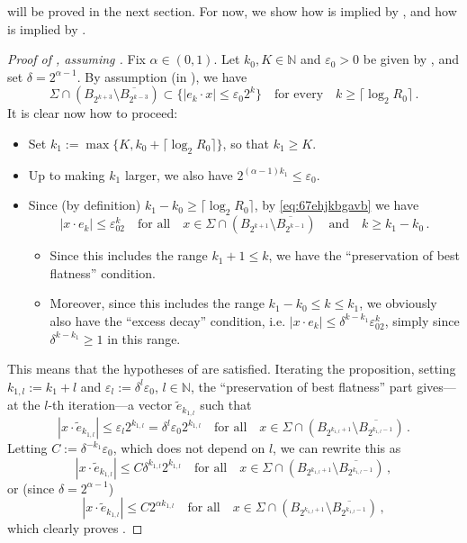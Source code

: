 \documentclass{article}
\newcommand{\N}{\mathbb{N}}
\newcommand{\ep}{\varepsilon}
\theoremstyle{definition}
\begin{document}
 will be proved in the next section. For now, we show how  is implied by , and how  is implied by .
\begin{proof}[Proof of , assuming ]
    Fix $\alpha\in (0,1)$. Let $k_0,K\in\N$ and $\ep_0>0$ be given by , and set $\delta=2^{\alpha-1}$. By assumption (in ), we have
    \begin{equation}\label{eq:67ehjkbgavb}
        \Sigma \cap (B_{2^{k+3}}\setminus \overline{B_{2^{k-3}}})\subset \{|e_k\cdot x|\leq \ep_0 2^k\}\quad\mbox{for every}\quad k\geq \lceil \log_2{R_0}\rceil\,.
    \end{equation}
    It is clear now how to proceed:
    \begin{itemize}
        \item Set $k_1:=\max\{K,k_0+\lceil \log_2{R_0}\rceil\}$, so that $k_1\geq K$.
        \item Up to making $k_1$ larger, we also have $2^{(\alpha-1)k_1}\leq \ep_0$.
        \item Since (by definition) $k_1-k_0\geq \lceil \log_2{R_0}\rceil$, by \eqref{eq:67ehjkbgavb} we have
        $$|x\cdot e_k|\leq \ep_02^k\quad \mbox{for all}\quad x\in\Sigma\cap(B_{2^{k+1}}\setminus \overline{B_{2^{k-1}}})\quad\mbox{and}\quad k\geq k_1-k_0\,.$$
        \begin{itemize}
            \item Since this includes the range $k_1+1\leq k$, we have the ``preservation of best flatness'' condition.
            \item Moreover, since this includes the range $k_1-k_0\leq k\leq k_1$, we obviously also have the ``excess decay'' condition, i.e. $|x\cdot e_k|\leq \delta^{k-k_1}\ep_02^k$, simply since $\delta^{k-k_1}\geq 1$ in this range.
        \end{itemize}
        
    \end{itemize}
    This means that the hypotheses of  are satisfied. Iterating the proposition, setting $k_{1,l}:=k_1+l$ and $\ep_l:=\delta^l \ep_0$, $l\in\N$, the ``preservation of best flatness'' part gives---at the $l$-th iteration---a vector $\widetilde e_{k_{1,l}}$ such that
    $$|x\cdot \widetilde e_{k_{1,l}}|\leq \ep_l2^{k_{1,l}}= \delta^l \ep_0 2^{k_{1,l}}\quad\mbox{for all}\quad x\in \Sigma\cap (B_{2^{k_{1,l}+1}}\setminus \overline{B_{2^{k_{1,l}-1}}})\,.$$
    Letting $C:=\delta^{-k_1}\ep_0$, which does not depend on $l$, we can rewrite this as
    $$|x\cdot \widetilde e_{k_{1,l}}|\leq  C\delta^{k_{1,l}} 2^{k_{1,l}}\quad\mbox{for all}\quad x\in \Sigma\cap (B_{2^{k_{1,l}+1}}\setminus \overline{B_{2^{k_{1,l}-1}}})\,,$$
    or (since $\delta=2^{\alpha-1}$)
    $$|x\cdot \widetilde e_{k_{1,l}}|\leq  C 2^{\alpha k_{1,l}}\quad\mbox{for all}\quad x\in \Sigma\cap (B_{2^{k_{1,l}+1}}\setminus \overline{B_{2^{k_{1,l}-1}}})\,,$$
    which clearly proves .
\end{proof}
\end{document}

